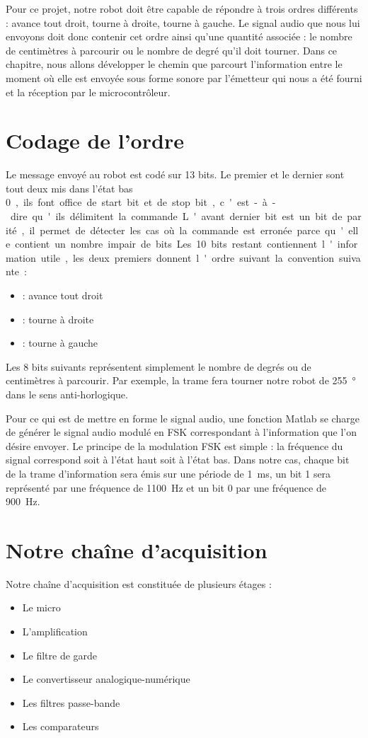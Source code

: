 Pour ce projet, notre robot doit être capable de répondre à trois ordres différents : avance tout droit, tourne à droite, tourne à gauche. Le signal audio que nous lui envoyons doit donc contenir cet ordre ainsi qu'une quantité associée : le nombre de centimètres à parcourir ou le nombre de degré qu'il doit tourner. Dans ce chapitre, nous allons développer le chemin que parcourt l'information entre le moment où elle est envoyée sous forme sonore par l'émetteur qui nous a été fourni et la réception par le microcontrôleur.

\section{Codage de l'ordre}
Le message envoyé au robot est codé sur 13 bits. Le premier et le dernier sont tout deux mis dans l'état bas \SI{0}, ils font office de start bit et de stop bit, c'est-à-dire qu'ils délimitent la commande. L'avant dernier bit est un bit de parité, il permet de détecter les cas où la commande est erronée parce qu'elle contient un nombre impair de bits. Les \SI{10} bits restant contiennent l'information utile, les deux premiers donnent l'ordre suivant la convention suivante :
\begin{itemize}
\item {} : avance tout droit
\item {} : tourne à droite
\item {} : tourne à gauche
\end{itemize}
Les 8 bits suivants représentent simplement le nombre de degrés ou de centimètres à parcourir. Par exemple, la trame  fera tourner notre robot de \SI{255}{\degree} dans le sens anti-horlogique.

Pour ce qui est de mettre en forme le signal audio, une fonction Matlab se charge de générer le signal audio modulé en FSK correspondant à l'information que l'on désire envoyer. Le principe de la modulation FSK est simple : la fréquence du signal correspond soit à l'état haut soit à l'état bas. Dans notre cas, chaque bit de la trame d'information sera émis sur une période de \SI{1}{\milli\second}, un bit 1 sera représenté par une fréquence de \SI{1100}{\hertz} et un bit 0 par une fréquence de \SI{900}{\hertz}. 

\section{Notre chaîne d'acquisition}
Notre chaîne d'acquisition est constituée de plusieurs étages :
\begin{itemize}
\item Le micro
\item L'amplification
\item Le filtre de garde
\item Le convertisseur analogique-numérique
\item Les filtres passe-bande
\item Les comparateurs
\end{itemize}

